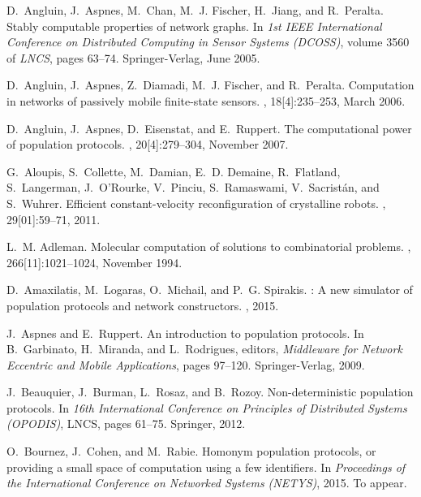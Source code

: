 \documentclass[preprint]{elsarticle}
\begin{document}
\newcommand{\etalchar}[1]{}
\begin{thebibliography}{CKLWL09}

\bibitem[AAC{\etalchar{+}}05]{AACFJP05}
D.~Angluin, J.~Aspnes, M.~Chan, M.~J. Fischer, H.~Jiang, and R.~Peralta.
\newblock Stably computable properties of network graphs.
\newblock In {\em 1st IEEE International Conference on Distributed Computing in
  Sensor Systems (DCOSS)}, volume 3560 of {\em LNCS}, pages 63--74.
  Springer-Verlag, June 2005.

\bibitem[AAD{\etalchar{+}}06]{AADFP06}
D.~Angluin, J.~Aspnes, Z.~Diamadi, M.~J. Fischer, and R.~Peralta.
\newblock Computation in networks of passively mobile finite-state sensors.
, 18[4]:235--253, March 2006.

D.~Angluin, J.~Aspnes, D.~Eisenstat, and E.~Ruppert.
\newblock The computational power of population protocols.
, 20[4]:279--304, November 2007.

\bibitem[ACD{\etalchar{+}}11]{ACD11}
G.~Aloupis, S.~Collette, M.~Damian, E.~D. Demaine, R.~Flatland, S.~Langerman,
  J.~O'Rourke, V.~Pinciu, S.~Ramaswami, V.~Sacrist{\'a}n, and S.~Wuhrer.
\newblock Efficient constant-velocity reconfiguration of crystalline robots.
, 29[01]:59--71, 2011.

L.~M. Adleman.
\newblock Molecular computation of solutions to combinatorial problems.
, 266[11]:1021--1024, November 1994.

D.~Amaxilatis, M.~Logaras, O.~Michail, and P.~G. Spirakis.
: A new simulator of population protocols and network
  constructors.
, 2015.

J.~Aspnes and E.~Ruppert.
\newblock An introduction to population protocols.
\newblock In B.~Garbinato, H.~Miranda, and L.~Rodrigues, editors, {\em
  Middleware for Network Eccentric and Mobile Applications}, pages 97--120.
  Springer-Verlag, 2009.

J.~Beauquier, J.~Burman, L.~Rosaz, and B.~Rozoy.
\newblock Non-deterministic population protocols.
\newblock In {\em 16th International Conference on Principles of Distributed
  Systems (OPODIS)}, LNCS, pages 61--75. Springer, 2012.

O.~Bournez, J.~Cohen, and M.~Rabie.
\newblock Homonym population protocols, or providing a small space of
  computation using a few identifiers.
\newblock In {\em Proceedings of the International Conference on Networked
  Systems (NETYS)}, 2015.
\newblock To appear.


\end{thebibliography}
\end{document}
